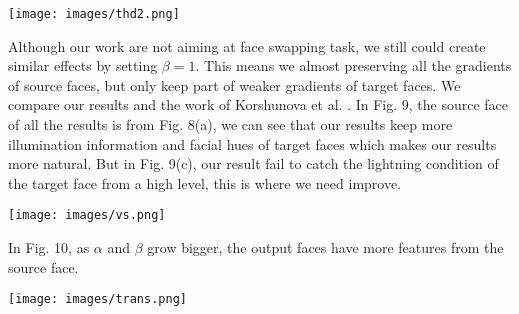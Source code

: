 \begin{center}
    \texttt{[image: images/thd2.png]}
\end{center}

Although our work are not aiming at face swapping task, we still could create similar effects by setting $\beta = 1$. This means we almost preserving all the gradients of source faces, but only keep part of weaker gradients of target faces. We compare our results and the work of Korshunova et al. \cite{faceswapping}. In Fig. 9, the source face of all the results is from Fig. 8(a), we can see that our results keep more illumination information and facial hues of target faces which makes our results more natural. But in Fig. 9(c), our result fail to catch the lightning condition of the target face from a high level, this is where we need improve.

\begin{center}
    \texttt{[image: images/vs.png]}
\end{center}

In Fig. 10, as $\alpha$ and $\beta$ grow bigger, the output faces have more features from the source face.

\begin{center}
    \texttt{[image: images/trans.png]}
\end{center}
